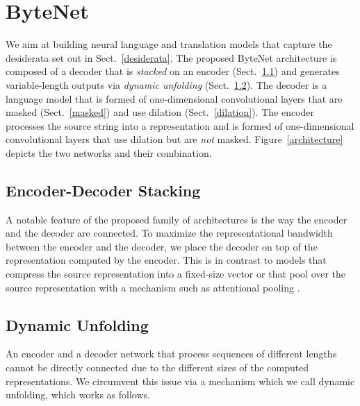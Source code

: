 \documentclass{article}
\begin{document}
\section{ByteNet}
\label{bytenet}
We aim at building neural language and translation models that capture the desiderata set out in Sect.~\ref{desiderata}. The proposed ByteNet architecture is composed of a decoder that is \emph{stacked} on an encoder (Sect.~\ref{sec:stacking}) and generates variable-length outputs via \emph{dynamic unfolding} (Sect.~\ref{sec:dynunf}). The decoder is a language model that is formed of one-dimensional convolutional layers that are masked (Sect.~\ref{masked}) and use dilation (Sect.~\ref{dilation}).  The encoder processes the source string into a representation and is formed of one-dimensional convolutional layers that use dilation but are \emph{not} masked. Figure~\ref{architecture} depicts the two networks and their combination. 


\subsection{Encoder-Decoder Stacking}
\label{sec:stacking}
A notable feature of the proposed family of architectures is the way the encoder and the decoder are connected. To maximize the representational bandwidth between the encoder and the decoder, we place the decoder on top of the representation computed by the encoder. This is in contrast to models that compress the source representation into a fixed-size vector \citep{kalchbrenner13emnlp,DBLP:conf/nips/SutskeverVL14} or that pool over the source representation with a mechanism such as attentional pooling \citep{DBLP:journals/corr/BahdanauCB14}. 

\subsection{Dynamic Unfolding}
\label{sec:dynunf}
An encoder and a decoder network that process sequences of different lengths cannot be directly connected due to the different sizes of the computed representations. We circumvent this issue via a mechanism which we call dynamic unfolding, which works as follows.
\end{document}
